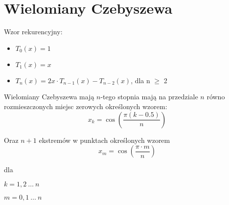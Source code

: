 \section*{Wielomiany Czebyszewa}
Wzor rekurencyjny:

\begin{itemize}
    \item $T_0(x) = 1$
    \item $T_1(x) = x$
    \item $T_n(x) = 2x\cdot T_{n-1}(x)-T_{n-2}(x)$, dla n $\ge$ 2 
\end{itemize}

Wielomiany Czebyszewa mają $n$-tego stopnia mają na przedziale $n$
równo rozmieszczonych miejsc zerowych określonych wzorem:
\begin{equation*}
    x_k = \cos{\left(\frac{\pi\left(k-0.5\right)}{n}\right)}
\end{equation*}

Oraz $n + 1$ ekstremów w punktach określonych wzorem
\begin{equation*}
    x_m = \cos{\left(\frac{\pi\cdot m}{n}\right)}
\end{equation*}

dla

$k = 1, 2\ \hdots\ n$

$m = 0, 1\ \hdots\ n$